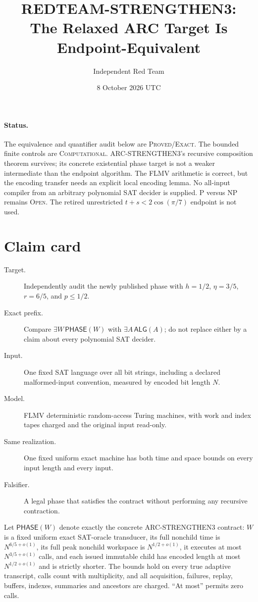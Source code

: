 \documentclass[11pt]{article}
\title{REDTEAM-STRENGTHEN3:\\The Relaxed ARC Target Is Endpoint-Equivalent}
\author{Independent Red Team}
\date{8 October 2026 UTC}
\newcommand{\PHASE}{\mathsf{PHASE}}
\newcommand{\ALG}{\mathsf{ALG}}
\begin{document}
\sloppy\maketitle

\paragraph{Status.}
The equivalence and quantifier audit below are \textsc{Proved/Exact}.  The
bounded finite controls are \textsc{Computational}.  ARC-STRENGTHEN3's
recursive composition theorem survives; its concrete existential phase
target is not a weaker intermediate than the endpoint algorithm.  The FLMV
arithmetic is correct, but the encoding transfer needs an explicit local
encoding lemma.  No all-input compiler from an arbitrary polynomial SAT
decider is supplied.  P versus NP remains \textsc{Open}.  The retired
unrestricted $t+s<2\cos(\pi/7)$ endpoint is not used.

\section{Claim card}

\begin{description}
\item[Target.] Independently audit the newly published phase with
$h=1/2$, $\eta=3/5$, $r=6/5$, and $p\le1/2$.
\item[Exact prefix.] Compare
$\exists W\,\PHASE(W)$ with $\exists A\,\ALG(A)$; do not replace either by
a claim about every polynomial SAT decider.
\item[Input.] One fixed SAT language over all bit strings, including a
declared malformed-input convention, measured by encoded bit length $N$.
\item[Model.] FLMV deterministic random-access Turing machines, with work and
index tapes charged and the original input read-only.
\item[Same realization.] One fixed uniform exact machine has both time and
space bounds on every input length and every input.
\item[Falsifier.] A legal phase that satisfies the contract without
performing any recursive contraction.
\end{description}

Let $\PHASE(W)$ denote exactly the concrete ARC-STRENGTHEN3 contract:
$W$ is a fixed uniform exact SAT-oracle transducer, its full nonchild time is
$N^{6/5+o(1)}$, its full peak nonchild workspace is $N^{1/2+o(1)}$, it
executes at most $N^{3/5+o(1)}$ calls, and each issued immutable child has
encoded length at most $N^{1/2+o(1)}$ and is strictly shorter.  The bounds
hold on every true adaptive transcript, calls count with multiplicity, and
all acquisition, failures, replay, buffers, indexes, summaries and ancestors
are charged.  ``At most'' permits zero calls.
\end{document}
